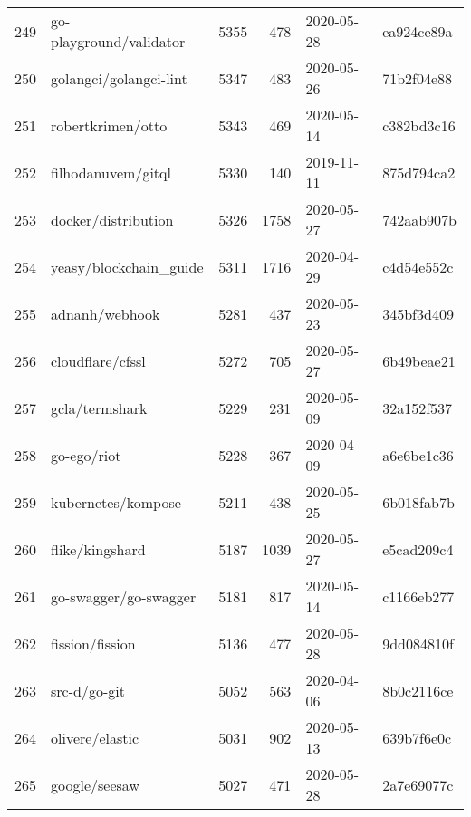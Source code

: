 \begin{footnotesize}
\begin{longtable}{llrrll}
        249 &                            go-playground/validator &   5355 &    478 & 2020-05-28 &  ea924ce89a \\
        250 &                             golangci/golangci-lint &   5347 &    483 & 2020-05-26 &  71b2f04e88 \\
        251 &                                  robertkrimen/otto &   5343 &    469 & 2020-05-14 &  c382bd3c16 \\
        252 &                                 filhodanuvem/gitql &   5330 &    140 & 2019-11-11 &  875d794ca2 \\
        253 &                                docker/distribution &   5326 &   1758 & 2020-05-27 &  742aab907b \\
        254 &                             yeasy/blockchain\_guide &   5311 &   1716 & 2020-04-29 &  c4d54e552c \\
        255 &                                     adnanh/webhook &   5281 &    437 & 2020-05-23 &  345bf3d409 \\
        256 &                                   cloudflare/cfssl &   5272 &    705 & 2020-05-27 &  6b49beae21 \\
        257 &                                     gcla/termshark &   5229 &    231 & 2020-05-09 &  32a152f537 \\
        258 &                                        go-ego/riot &   5228 &    367 & 2020-04-09 &  a6e6be1c36 \\
        259 &                                 kubernetes/kompose &   5211 &    438 & 2020-05-25 &  6b018fab7b \\
        260 &                                    flike/kingshard &   5187 &   1039 & 2020-05-27 &  e5cad209c4 \\
        261 &                              go-swagger/go-swagger &   5181 &    817 & 2020-05-14 &  c1166eb277 \\
        262 &                                    fission/fission &   5136 &    477 & 2020-05-28 &  9dd084810f \\
        263 &                                       src-d/go-git &   5052 &    563 & 2020-04-06 &  8b0c2116ce \\
        264 &                                    olivere/elastic &   5031 &    902 & 2020-05-13 &  639b7f6e0c \\
        265 &                                      google/seesaw &   5027 &    471 & 2020-05-28 &  2a7e69077c \\

\end{longtable}
\end{footnotesize}
